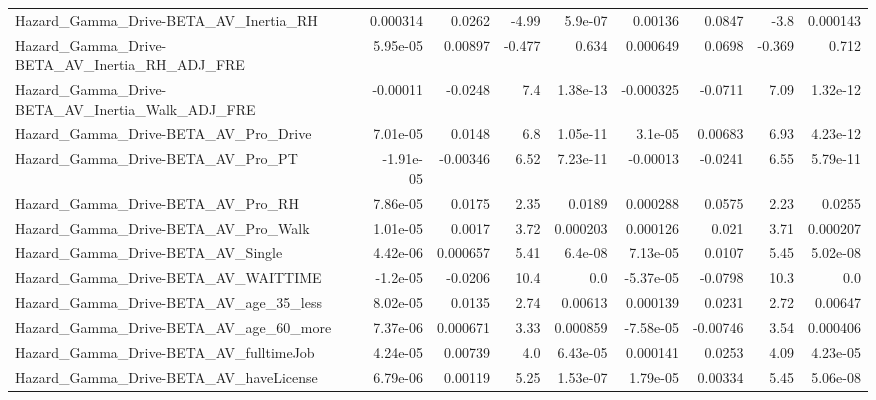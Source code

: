 \begin{tabular}{lrrrrrrrr}
Hazard\_Gamma\_Drive-BETA\_AV\_Inertia\_RH              &    0.000314 &       0.0262 &    -4.99 &  5.9e-07 &    0.00136 &      0.0847 &         -3.8 &      0.000143 \\
Hazard\_Gamma\_Drive-BETA\_AV\_Inertia\_RH\_ADJ\_FRE      &    5.95e-05 &      0.00897 &   -0.477 &    0.634 &   0.000649 &      0.0698 &       -0.369 &         0.712 \\
Hazard\_Gamma\_Drive-BETA\_AV\_Inertia\_Walk\_ADJ\_FRE    &    -0.00011 &      -0.0248 &      7.4 & 1.38e-13 &  -0.000325 &     -0.0711 &         7.09 &      1.32e-12 \\
Hazard\_Gamma\_Drive-BETA\_AV\_Pro\_Drive               &    7.01e-05 &       0.0148 &      6.8 & 1.05e-11 &    3.1e-05 &     0.00683 &         6.93 &      4.23e-12 \\
Hazard\_Gamma\_Drive-BETA\_AV\_Pro\_PT                  &   -1.91e-05 &     -0.00346 &     6.52 & 7.23e-11 &   -0.00013 &     -0.0241 &         6.55 &      5.79e-11 \\
Hazard\_Gamma\_Drive-BETA\_AV\_Pro\_RH                  &    7.86e-05 &       0.0175 &     2.35 &   0.0189 &   0.000288 &      0.0575 &         2.23 &        0.0255 \\
Hazard\_Gamma\_Drive-BETA\_AV\_Pro\_Walk                &    1.01e-05 &       0.0017 &     3.72 & 0.000203 &   0.000126 &       0.021 &         3.71 &      0.000207 \\
Hazard\_Gamma\_Drive-BETA\_AV\_Single                  &    4.42e-06 &     0.000657 &     5.41 &  6.4e-08 &   7.13e-05 &      0.0107 &         5.45 &      5.02e-08 \\
Hazard\_Gamma\_Drive-BETA\_AV\_WAITTIME                &    -1.2e-05 &      -0.0206 &     10.4 &      0.0 &  -5.37e-05 &     -0.0798 &         10.3 &           0.0 \\
Hazard\_Gamma\_Drive-BETA\_AV\_age\_35\_less             &    8.02e-05 &       0.0135 &     2.74 &  0.00613 &   0.000139 &      0.0231 &         2.72 &       0.00647 \\
Hazard\_Gamma\_Drive-BETA\_AV\_age\_60\_more             &    7.37e-06 &     0.000671 &     3.33 & 0.000859 &  -7.58e-05 &    -0.00746 &         3.54 &      0.000406 \\
Hazard\_Gamma\_Drive-BETA\_AV\_fulltimeJob             &    4.24e-05 &      0.00739 &      4.0 & 6.43e-05 &   0.000141 &      0.0253 &         4.09 &      4.23e-05 \\
Hazard\_Gamma\_Drive-BETA\_AV\_haveLicense             &    6.79e-06 &      0.00119 &     5.25 & 1.53e-07 &   1.79e-05 &     0.00334 &         5.45 &      5.06e-08 \\

\end{tabular}
